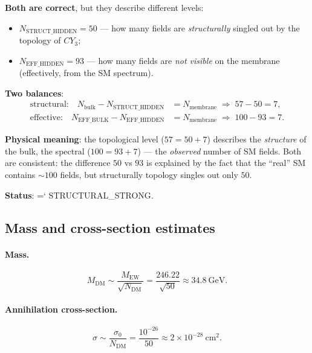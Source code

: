 \documentclass[11pt,a4paper]{article}
\newcommand{\CY}{CY_3}
\newcommand{\MEW}{M_{\text{EW}}}
\renewcommand{\texttt}[1]{{\ttfamily\hyphenchar\font=`\- #1}}
\theoremstyle{definition}
\begin{document}
\noindent
\textbf{Both are correct}, but they describe different levels:
\begin{itemize}
    \item $N_{\text{STRUCT\_HIDDEN}} = 50$ — how many fields are \emph{structurally}
          singled out by the topology of $\CY$;
    \item $N_{\text{EFF\_HIDDEN}} = 93$ — how many fields are \emph{not visible}
          on the membrane (effectively, from the SM spectrum).
\end{itemize}

\medskip\noindent
\textbf{Two balances}:
\begin{align}
    \text{structural:} \quad
    N_{\text{bulk}} - N_{\text{STRUCT\_HIDDEN}} &= N_{\text{membrane}}
    \;\Rightarrow\; 57 - 50 = 7, \\
    \text{effective:} \quad
    N_{\text{EFF\_BULK}} - N_{\text{EFF\_HIDDEN}} &= N_{\text{membrane}}
    \;\Rightarrow\; 100 - 93 = 7.
\end{align}

\medskip\noindent
\textbf{Physical meaning}: the topological level ($57 = 50 + 7$)
describes the \emph{structure} of the bulk, the spectral ($100 = 93 + 7$) —
the \emph{observed} number of SM fields.
Both are consistent: the difference $50$ vs $93$ is explained by the fact that
the ``real'' SM contains $\sim 100$ fields, but structurally
topology singles out only $50$.

\medskip\noindent
\textbf{Status}: \texttt{STRUCTURAL\_STRONG}.

\subsection{Mass and cross-section estimates}
\label{subsec:dm-estimates}

\paragraph{Mass.}
\begin{equation}
    \boxed{
    M_{\text{DM}} \sim \frac{\MEW}{\sqrt{N_{\text{DM}}}}
    = \frac{246.22}{\sqrt{50}} \approx 34.8~\text{GeV}.
    }
    \label{eq:dm-mass}
\end{equation}

\paragraph{Annihilation cross-section.}
\begin{equation}
    \sigma \sim \frac{\sigma_0}{N_{\text{DM}}}
    = \frac{10^{-26}}{50} \approx 2 \times 10^{-28}~\text{cm}^2.
\end{equation}
\end{document}

